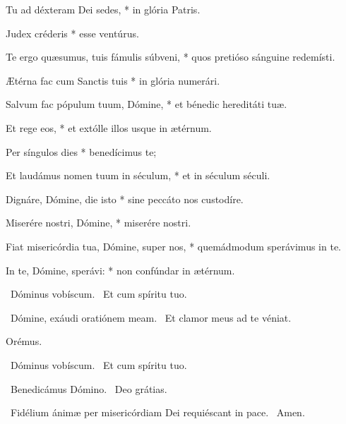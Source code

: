 Tu ad déxteram Dei sedes, * in glória Patris.

Judex créderis * esse ventúrus.


Te ergo quæsumus, tuis fámulis súbveni, * quos pretióso sánguine redemísti.

Ætérna fac cum Sanctis tuis * in glória numerári.

Salvum fac pópulum tuum, Dómine, * et bénedic hereditáti tuæ.

Et rege eos, * et extólle illos usque in ætérnum.

Per síngulos dies * benedícimus te;

Et laudámus nomen tuum in séculum, * et in séculum séculi.

Dignáre, Dómine, die isto * sine peccáto nos custodíre.

Miserére nostri, Dómine, * miserére nostri.

Fiat misericórdia tua, Dómine, super nos, * quemádmodum sperávimus in te.

In te, Dómine, sperávi: * non confúndar in ætérnum.



\V\ Dóminus vobíscum. \R\ Et cum spíritu tuo.


\V\ Dómine, exáudi oratiónem meam. \R\ Et clamor meus ad te véniat.

Orémus.



\V\ Dóminus vobíscum. \R\ Et cum spíritu tuo.

\V\ Benedicámus Dómino. \R\ Deo grátias.

\V\ Fidélium ánimæ per misericórdiam Dei requiéscant in pace. \R\ Amen.



